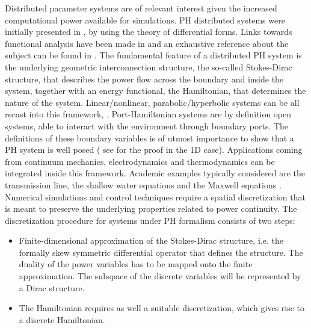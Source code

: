 \documentclass[11pt]{article}
\begin{document}
	
	Distributed parameter systems are of relevant interest given the increased computational power available for simulations. PH distributed systems were initially presented in \cite{VANDERSCHAFT2002166}, by using the theory of differential forms. Links towards functional analysis have been made in \cite{Villegas} and an exhaustive reference about the subject can be found in \cite{BookZwart}. The fundamental feature of a distributed PH system is the underlying geometric interconnection structure, the so-called Stokes-Dirac structure, that describes the power flow across the boundary and inside the system, together with an energy functional, the Hamiltonian, that determines the nature of the system. Linear/nonlinear, parabolic/hyperbolic systems can be all recast into this framework, \cite{bookPHs}. Port-Hamiltonian systems are by definition open systems, able to interact with the environment through boundary ports. The definitions of these boundary variables is of utmost importance to show that a PH system is well posed ( see \cite{LeGorrec2005} for the proof in the 1D case). Applications coming from continuum mechanics, electrodynamics and thermodynamics can be integrated inside this framework. Academic examples typically considered are the transmission line, the shallow water equations and the Maxwell equations \cite{VANDERSCHAFT2002166}. \\
	
	Numerical simulations and control techniques require a spatial discretization that is meant to preserve the underlying properties related to power continuity. The discretization procedure for systems under PH formalism consists of two steps:
	\begin{itemize}
		\item Finite-dimensional approximation of the Stokes-Dirac structure, i.e. the formally skew symmetric differential operator that defines the structure. The duality of the power variables has to be mapped onto the finite approximation. The subspace of the discrete variables will be represented by a Dirac structure. 
		\item The Hamiltonian requires as well a suitable discretization, which gives rise to a discrete Hamiltonian. 
	\end{itemize} 
	
\end{document}
